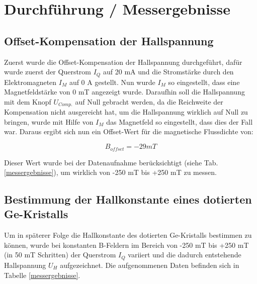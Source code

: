 \documentclass[12pt, a4paper]{article}
\begin{document}
\newpage
\section{Durchführung / Messergebnisse}

\subsection{Offset-Kompensation der Hallspannung}
Zuerst wurde die Offset-Kompensation der Hallspannung durchgeführt, dafür wurde zuerst der Querstrom $I_Q$ auf 20 mA und die Stromstärke durch den Elektromagneten $I_M$ auf 0 A gestellt. Nun wurde $I_M$ so eingestellt, dass eine Magnetfeldstärke von 0 mT angezeigt wurde. Daraufhin soll die Hallspannung mit dem Knopf $U_{Comp.}$ auf Null gebracht werden, da die Reichweite der Kompensation nicht ausgereicht hat, um die Hallspannung wirklich auf Null zu bringen, wurde mit Hilfe von $I_M$ das Magnetfeld so eingestellt, dass dies der Fall war. Daraus ergibt sich nun ein Offset-Wert für die magnetische Flussdichte von:

\begin{equation*}
    B_{offset} = -29 mT
\end{equation*}

Dieser Wert wurde bei der Datenaufnahme berücksichtigt (siehe Tab. \ref{messergebnisse}), um wirklich von -250 mT bis +250 mT zu messen.

\subsection{Bestimmung der Hallkonstante eines dotierten Ge-Kristalls}
\label{5_Hallkonstante}

Um in späterer Folge die Hallkonstante des dotierten Ge-Kristalls bestimmen zu können, wurde bei konstanten B-Feldern im Bereich von -250 mT bis +250 mT (in 50 mT Schritten) der Querstrom $I_Q$ variiert und die dadurch entstehende Hallspannung $U_H$ aufgezeichnet. Die aufgenommenen Daten befinden sich in Tabelle \ref{messergebnisse}.
\end{document}
